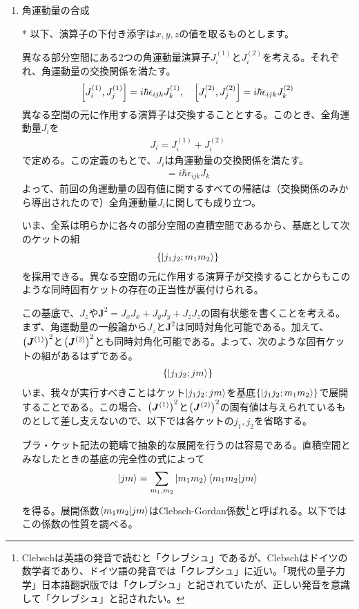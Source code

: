 \documentclass[dvipdfmx]{jarticle}
\theoremstyle{plain}
\begin{document}
\begin{enumerate}
  \item 角運動量の合成

    * 以下、演算子の下付き添字は$x, y, z$の値を取るものとします。
    
    異なる部分空間にある2つの角運動量演算子$J_i^{(1)}$と$J_i^{(2)}$を考える。それぞれ、角運動量の交換関係を満たす。
    \begin{align}
      \qty[J^{(1)}_i, J^{(1)}_j] = i\hbar \epsilon_{ijk}J^{(1)}_k, \quad \qty[J^{(2)}_i, J^{(2)}_j] = i\hbar \epsilon_{ijk}J^{(2)}_k
    \end{align}
    異なる空間の元に作用する演算子は交換することとする。このとき、全角運動量$J_i$を
    \begin{align}
      J_i = J^{(1)}_i + J^{(2)}_i
    \end{align}
    で定める。この定義のもとで、$J_i$は角運動量の交換関係を満たす。
    \begin{align}
      [J_i, J_j] = i\hbar\epsilon_{ijk}J_k
    \end{align}
    よって、前回の角運動量の固有値に関するすべての帰結は（交換関係のみから導出されたので）全角運動量$J_i$に関しても成り立つ。

    いま、全系は明らかに各々の部分空間の直積空間であるから、基底として次のケットの組
    \begin{align}
      \qty{\ket{j_1j_2;m_1m_2}}
    \end{align}
    を採用できる。異なる空間の元に作用する演算子が交換することからもこのような同時固有ケットの存在の正当性が裏付けられる。
    
    この基底で、$J_z$や$\bm{J}^2 = J_xJ_x + J_yJ_y + J_zJ_z$の固有状態を書くことを考える。まず、角運動量の一般論から$J_z$と$\bm{J}^2$は同時対角化可能である。加えて、$\qty(\bm{J}^{(1)})^2$と$\qty(\bm{J}^{(2)})^2$とも同時対角化可能である。よって、次のような固有ケットの組があるはずである。
    \begin{align}
      \qty{\ket{j_1j_2;jm}}
    \end{align}
    いま、我々が実行すべきことはケット$\ket{j_1j_2;jm}$を基底$\qty{\ket{j_1j_2;m_1m_2}}$で展開することである。この場合、$\qty(\bm{J}^{(1)})^2$と$\qty(\bm{J}^{(2)})^2$の固有値は与えられているものとして差し支えないので、以下では各ケットの$j_1, j_2$を省略する。

    ブラ・ケット記法の範疇で抽象的な展開を行うのは容易である。直積空間とみなしたときの基底の完全性の式によって
    \begin{align}
      \ket{jm} = \sum_{m_1, m_2}\ket{m_1m_2}\bra{m_1m_2}\ket{jm}
    \end{align}
    を得る。展開係数$\bra{m_1m_2}\ket{jm}$はClebsch-Gordan係数\footnote{Clebschは英語の発音で読むと「クレブシュ」であるが、Clebschはドイツの数学者であり、ドイツ語の発音では「クレプシュ」に近い。「現代の量子力学」日本語翻訳版では「クレブシュ」と記されていたが、正しい発音を意識して「クレブシュ」と記されたい。}と呼ばれる。以下ではこの係数の性質を調べる。


\end{enumerate}
\end{document}
